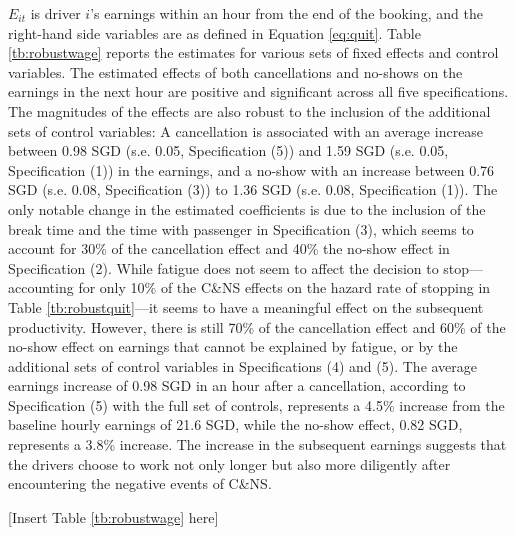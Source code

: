 \documentclass[reviewmode,AEJ]{AEA}
\begin{document}
$E_{it}$ is driver $i$'s earnings within an hour from the end of the booking, and the right-hand side variables are as defined in Equation \ref{eq:quit}. Table \ref{tb:robustwage} reports the estimates for various sets of fixed effects and control variables. The estimated effects of both cancellations and no-shows on the earnings in the next hour are positive and significant across all five specifications. The magnitudes of the effects are also robust to the inclusion of the additional sets of control variables: A cancellation is associated with an average increase between 0.98 SGD (s.e. 0.05, Specification (5)) and 1.59 SGD (s.e. 0.05, Specification (1)) in the earnings, and a no-show with an increase between 0.76 SGD (s.e. 0.08, Specification (3)) to 1.36 SGD (s.e. 0.08, Specification (1)). The only notable change in the estimated coefficients is due to the inclusion of the break time and the time with passenger in Specification (3), which seems to account for 30\% of the cancellation effect and 40\% the no-show effect in Specification (2). While fatigue does not seem to affect the decision to stop---accounting for only 10\% of the C\&NS effects on the hazard rate of stopping in Table \ref{tb:robustquit}---it seems to have a meaningful effect on the subsequent productivity. However, there is still 70\% of the cancellation effect and 60\% of the no-show effect on earnings that cannot be explained by fatigue, or by the additional sets of control variables in Specifications (4) and (5). The average earnings increase of 0.98 SGD in an hour after a cancellation, according to Specification (5) with the full set of controls, represents a 4.5\% increase from the baseline hourly earnings of 21.6 SGD, while the no-show effect, 0.82 SGD, represents a 3.8\% increase. The increase in the subsequent earnings suggests that the drivers choose to work not only  longer but also more diligently after encountering the negative events of C\&NS.


\begin{center}
	[Insert Table \ref{tb:robustwage} here]
\end{center}
\end{document}
